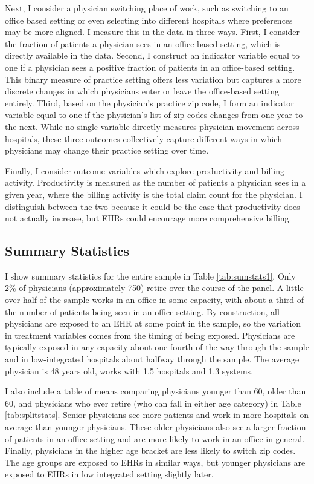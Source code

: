 \documentclass[11pt]{article}
\begin{document}
Next, I consider a physician switching place of work, such as switching to an office based setting or even selecting into different hospitals where preferences may be more aligned. I measure this in the data in three ways. First, I consider the fraction of patients a physician sees in an office-based setting, which is directly available in the data. Second, I construct an indicator variable equal to one if a physician sees a positive fraction of patients in an office-based setting. This binary measure of practice setting offers less variation but captures a more discrete changes in which physicians enter or leave the office-based setting entirely. Third, based on the physician's practice zip code, I form an indicator variable equal to one if the physician's list of zip codes changes from one year to the next. While no single variable directly measures physician movement across hospitals, these three outcomes collectively capture different ways in which physicians may change their practice setting over time.

Finally, I consider outcome variables which explore productivity and billing activity. Productivity is measured as the number of patients a physician sees in a given year, where the billing activity is the total claim count for the physician. I distinguish between the two because it could be the case that productivity does not actually increase, but EHRs could encourage more comprehensive billing. 

\subsection{Summary Statistics}

I show summary statistics for the entire sample in Table \ref{tab:sumstats1}. Only 2\% of physicians (approximately 750) retire over the course of the panel. A little over half of the sample works in an office in some capacity, with about a third of the number of patients being seen in an office setting. By construction, all physicians are exposed to an EHR at some point in the sample, so the variation in treatment variables comes from the timing of being exposed. Physicians are typically exposed in any capacity about one fourth of the way through the sample and in low-integrated hospitals about halfway through the sample. The average physician is 48 years old, works with 1.5 hospitals and 1.3 systems. 


I also include a table of means comparing physicians younger than 60, older than 60, and physicians who ever retire (who can fall in either age category) in Table \ref{tab:splitstats}. Senior physicians see more patients and work in more hospitals on average than younger physicians. These older physicians also see a larger fraction of patients in an office setting and are more likely to work in an office in general. Finally, physicians in the higher age bracket are less likely to switch zip codes. The age groups are exposed to EHRs in similar ways, but younger physicians are exposed to EHRs in low integrated setting slightly later. 
\end{document}
